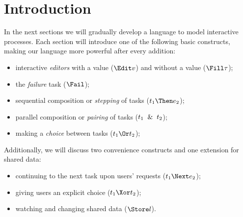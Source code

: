 
\section{Introduction}

In the next sections we will gradually develop a language to model interactive processes.
Each section will introduce one of the following basic constructs,
making our language more powerful after every addition:
\begin{itemize}
  \item interactive \emph{editors} with a value ($\Edit v$) and without a value ($\Fill \tau$);
  \item the \emph{failure} task ($\Fail$);
  \item sequential composition or \emph{stepping} of tasks ($t_1 \Then e_2$);
  \item parallel composition or \emph{pairing} of tasks ($t_1 \And t_2$);
  \item making a \emph{choice} between tasks ($t_1 \Or t_2$);
\end{itemize}
Additionally, we will discuss two convenience constructs and one extension for shared data:
\begin{itemize}
  \item continuing to the next task upon users' requests ($t_1 \Next e_2$);
  \item giving users an explicit choice ($t_1 \Xor t_2$);
  \item watching and changing shared data ($\Store l$).
\end{itemize}


